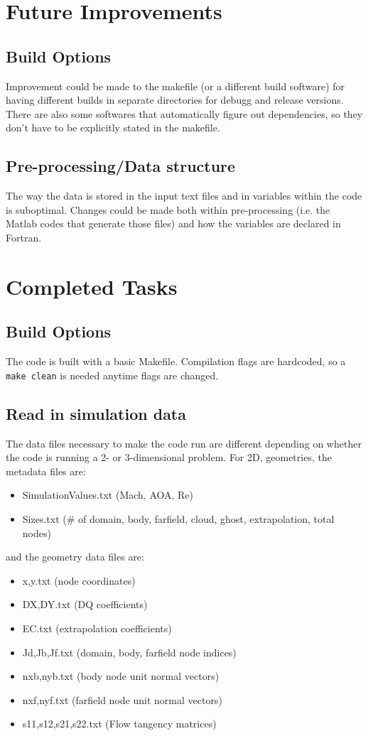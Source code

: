 \documentclass[12pt]{article}
\begin{document}
    \newpage
    \section{Future Improvements}
    \subsection{Build Options}
    Improvement could be made to the makefile (or a different build software) for having different builds in separate directories for debugg and release versions. There are also some softwares that automatically figure out dependencies, so they don't have to be explicitly stated in the makefile.

    \subsection{Pre-processing/Data structure}
    The way the data is stored in the input text files and in variables within the code is suboptimal. Changes could be made both within pre-processing (i.e. the Matlab codes that generate those files) and how the variables are declared in Fortran.

    \newpage
    \section{Completed Tasks}

    \subsection{Build Options}
    The code is built with a basic Makefile. Compilation flags are hardcoded, so a \texttt{make clean} is needed anytime flags are changed.

    \subsection{Read in simulation data}
    The data files necessary to make the code run are different depending on whether the code is running a 2- or 3-dimensional problem. For 2D, geometries, the metadata files are:
    \begin{itemize}
        \item SimulationValues.txt (Mach, AOA, Re)
        \item Sizes.txt (\# of domain, body, farfield, cloud, ghost, extrapolation, total nodes)
    \end{itemize}
    and the geometry data files are:
    \begin{itemize}
        \item x,y.txt (node coordinates)
        \item DX,DY.txt (DQ coefficients)
        \item EC.txt (extrapolation coefficients)
        \item Jd,Jb,Jf.txt (domain, body, farfield node indices)
        \item nxb,nyb.txt (body node unit normal vectors)
        \item nxf,nyf.txt (farfield node unit normal vectors)
        \item s11,s12,s21,s22.txt (Flow tangency matrices)
    \end{itemize}
\end{document}
